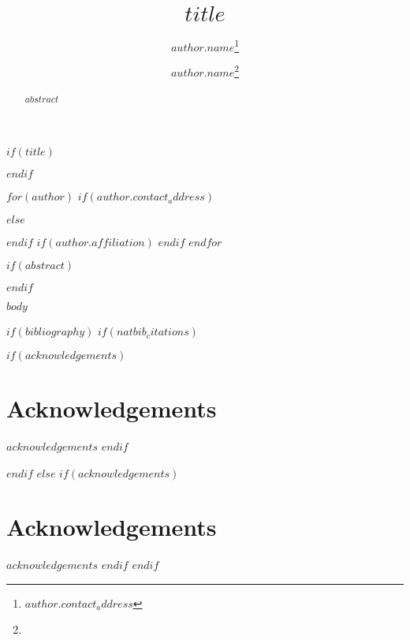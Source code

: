 \documentclass[$CL_style$]{clv3}
\begin{document}
$if(title)$
  \title{$title$}
$endif$

$for(author)$
  $if(author.contact_address)$
    \author{$author.name$\thanks{$author.contact_address$}}
  $else$
    \author{$author.name$\thanks{}}
  $endif$
  $if(author.affiliation)$
  $endif$
$endfor$

\maketitle

$if(abstract)$
\begin{abstract}
$abstract$
\end{abstract}
$endif$

$body$

$if(bibliography)$
$if(natbib_citations)$
\begin{multicols}{2}

$if(acknowledgements)$
\section*{Acknowledgements}\label{acknowledgements}
$acknowledgements$
$endif$



\end{multicols}
$endif$
$else$
$if(acknowledgements)$
\section*{Acknowledgements}\label{acknowledgements}
$acknowledgements$
$endif$
$endif$
\end{document}

